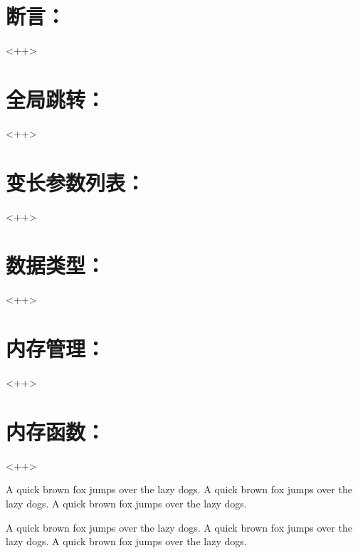 \section{断言：}
<++>

\section{全局跳转：}
<++>

\section{变长参数列表：}
<++>

\section{数据类型：}
<++>

\section{内存管理：}
<++>

\section{内存函数：}
<++>

A quick brown fox jumps over the lazy dogs.
A quick brown fox jumps over the lazy dogs.
A quick brown fox jumps over the lazy dogs.

A quick brown fox jumps over the lazy dogs.
A quick brown fox jumps over the lazy dogs.
A quick brown fox jumps over the lazy dogs.

\newpage{\thispagestyle{empty}\cleardoublepage}

